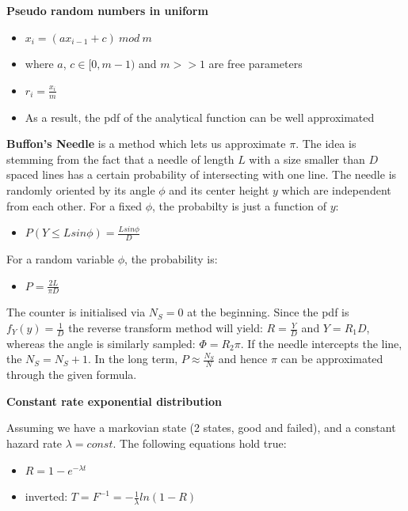 \documentclass[8pt, landscape, fleqn]{scrartcl}
\begin{document}
\begin{multicols*}{3}
\textbf{Pseudo random numbers in uniform}

\begin{itemize}
    \item $x_i = (ax_{i-1} + c)~mod~m$
    \item where $a$, $c \in [0,m-1)$ and $m>>1$ are free parameters 
    \item $r_i = \frac{x_i}{m}$
    \item As a result, the pdf of the analytical function can be well approximated
\end{itemize}

\textbf{Buffon's Needle} is a method which lets us approximate $\pi$. The idea is stemming from the fact that a needle of length $L$ with a size smaller than $D$ spaced lines has a certain probability of intersecting with one line. The needle is randomly oriented by its angle $\phi$ and its center height $y$ which are independent from each other. For a fixed $\phi$, the probabilty is just a function of $y$:

\begin{itemize}
    \item $P(Y \leq L sin\phi) = \frac{L sin\phi}{D}$
\end{itemize}


For a random variable $\phi$, the probability is:

\begin{itemize}
    \item $P = \frac{2L}{\pi D}$
\end{itemize}

The counter is initialised via $N_S = 0$ at the beginning. Since the pdf is $f_Y(y) = \frac{1}{D}$ the reverse transform method will yield: $R = \frac{Y}{D}$ and $Y = R_1 D$, whereas the angle is similarly sampled: $\Phi = R_2 \pi$. If the needle intercepts the line, the $N_S = N_S +1$. In the long term, $P \approx \frac{N_S}{N}$ and hence $\pi$ can be approximated through the given formula. \newline

\textbf{Constant rate exponential distribution}

Assuming we have a markovian state (2 states, good and failed), and a constant hazard rate $\lambda = const.$ The following equations hold true:

\begin{itemize}
    \item $R = 1-e^{-\lambda t}$
    \item inverted: $T = F^{-1} = -\frac{1}{\lambda} ln(1-R)$
\end{itemize}


\end{multicols*}
\end{document}
